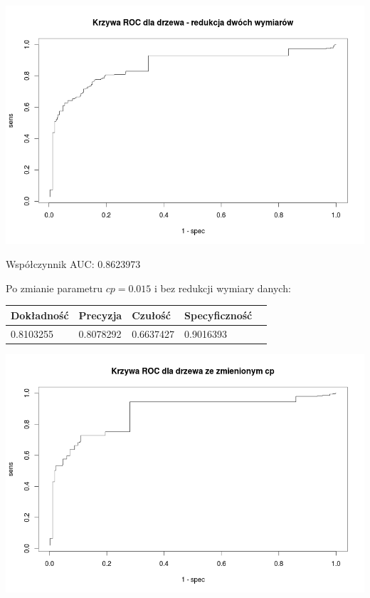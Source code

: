 \documentclass{article}
\begin{document}
\begin{center}
	\includegraphics[scale=0.40]{images/tree2.png}
\end{center}

Współczynnik AUC: 0.8623973

Po zmianie parametru $cp=0.015$ i bez redukcji wymiary danych:

\begin{center}
    \begin{tabular}{| l | l | l | l | l|}
    \hline
        Dokładność &  Precyzja &  Czułość & Specyficzność \\ \hline
      	0.8103255 & 0.8078292 & 0.6637427 & 0.9016393 \\
    \hline
    \end{tabular}
\end{center}

\begin{center}
	\includegraphics[scale=0.40]{images/cptreeNoPCA.png}
\end{center}
\end{document}
